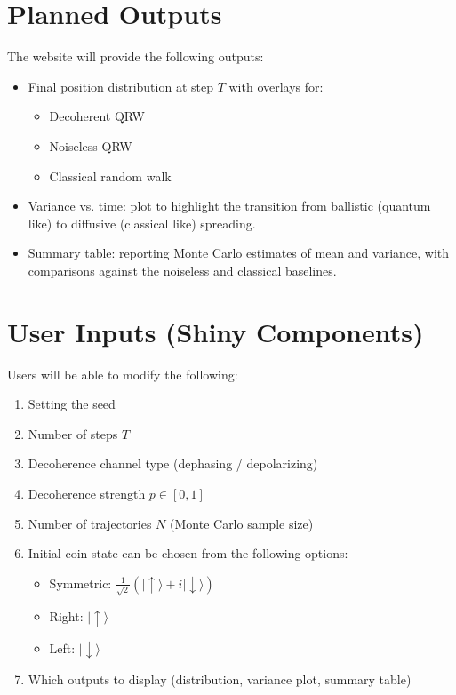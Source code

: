 \documentclass[11pt]{article}
\begin{document}
\newpage
\section{Planned Outputs}
The website will provide the following outputs:
\begin{itemize}
  \item Final position distribution at step $T$ with overlays for:
  \begin{itemize}
      \item Decoherent QRW
      \item Noiseless QRW
      \item Classical random walk
  \end{itemize}
  \item Variance vs. time: plot to highlight the transition from ballistic (quantum like) to diffusive (classical like) spreading.
  \item Summary table: reporting Monte Carlo estimates of mean and variance,
  with comparisons against the noiseless and classical baselines.
\end{itemize}

\section{User Inputs (Shiny Components)}
Users will be able to modify the following:
\begin{enumerate}
  \item Setting the seed
  \item Number of steps $T$
  \item Decoherence channel type (dephasing / depolarizing)
  \item Decoherence strength $p\in[0,1]$
  \item Number of trajectories $N$ (Monte Carlo sample size)
  \item Initial coin state can be chosen from the following options:
  \begin{itemize}
      \item Symmetric: $\frac{1}{\sqrt{2}}(|\uparrow\rangle+i|\downarrow\rangle)$
      \item Right: $| \uparrow\rangle$ 
      \item Left: $| \downarrow\rangle$
  \end{itemize}
  \item Which outputs to display (distribution, variance plot, summary table)
\end{enumerate}

\newpage

\cleardoublepage
\nocite{*}


\end{document}
